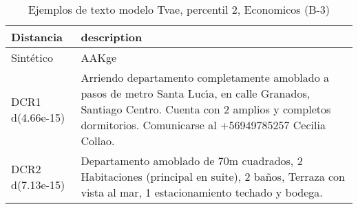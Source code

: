 \begin{table}[H]
\centering
\fontsize{10}{14}\selectfont
\caption{Ejemplos de texto modelo Tvae, percentil 2, Economicos (B-3)}
\label{table-example-economicos-b-3-tvae-2p-text}
\begin{tabular}{|l|m{35em}|}
\hline
\rowcolor[gray]{0.8}
Distancia & description \\
\hline Sintético & AAKge \\
\hline DCR1 d(4.66e-15) & Arriendo departamento completamente amoblado a pasos de metro Santa Luc{\'\i}a, en calle Granados, Santiago Centro. 
Cuenta con 2 amplios y completos dormitorios.
Comunicarse al +56949785257 Cecilia Collao. \\
\hline DCR2 d(7.13e-15) & Departamento amoblado de 70m cuadrados,
2 Habitaciones (principal en suite),
2 ba\~nos,
Terraza con vista al mar,
1 estacionamiento techado y bodega. \\
\hline
\end{tabular}
\end{table}
